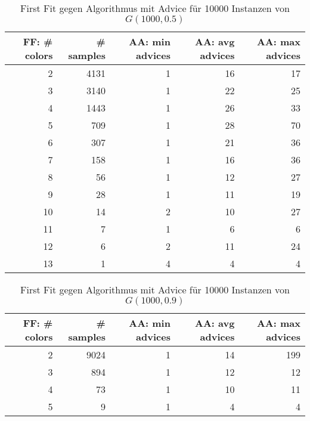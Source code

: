 \documentclass[11pt]{scrreprt} %
\theoremstyle{definition}
\begin{document}
\begin{table}
\caption{First Fit gegen Algorithmus mit Advice für 10000 Instanzen von $G(1000, 0.5)$}
\label{tab.exp1p05}
  \centering
    \begin{tabular}{rrrrr}
    \toprule
    FF: \# colors & \# samples & AA: min advices & AA: avg advices & AA: max advices \\
    \midrule
    2     & 4131  & 1     & 16    & 17 \\
    3     & 3140  & 1     & 22    & 25 \\
    4     & 1443  & 1     & 26    & 33 \\
    5     & 709   & 1     & 28    & 70 \\
    6     & 307   & 1     & 21    & 36 \\
    7     & 158   & 1     & 16    & 36 \\
    8     & 56    & 1     & 12    & 27 \\
    9     & 28    & 1     & 11    & 19 \\
    10    & 14    & 2     & 10    & 27 \\
    11    & 7     & 1     & 6     & 6 \\
    12    & 6     & 2     & 11    & 24 \\
    13    & 1     & 4     & 4     & 4 \\
    \bottomrule
    \end{tabular}%

\end{table}

\begin{table}
\caption{First Fit gegen Algorithmus mit Advice für 10000 Instanzen von $G(1000, 0.9)$}
\label{tab.exp1p09}
  \centering
\begin{tabular}{rrrrr}
\toprule
FF: \# colors & \# samples & AA: min advices & AA: avg advices & AA: max advices \\
\midrule
2     & 9024  & 1     & 14    & 199 \\
3     & 894   & 1     & 12    & 12 \\
4     & 73    & 1     & 10    & 11 \\
5     & 9     & 1     & 4     & 4 \\
\bottomrule
\end{tabular}%


\end{table}
\end{document}
